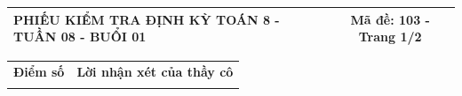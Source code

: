 \documentclass[12pt,a4paper]{article}
\begin{document}
\newpage
\noindent
\begin{tabularx}{\linewidth}{|X|c|}
\hline
\textbf{PHIẾU KIỂM TRA ĐỊNH KỲ TOÁN 8 - TUẦN 08 - BUỔI 01} & \textbf{Mã đề: 103 - Trang 1/2} \\
\hline
\end{tabularx}

\vspace{1.2mm}

\noindent
\begin{tabularx}{\linewidth}{|p{3.2cm}|X|}
\hline
\centering\textbf{Điểm số} & \centering\textbf{Lời nhận xét của thầy cô} \tabularnewline
\rule{0pt}{1.8cm} & \\
\hline
\end{tabularx}

\vspace{1.2mm}
\end{document}
